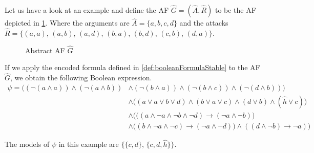 \begin{example}
    Let us have a look at an example and define the AF $\hat{G}=(\hat{A}, \hat{R})$ to be the AF depicted in \cref{af:algorithmEncodingsStable}. Where the arguments are $\hat{A}=\{a, b, c, d\}$ and the attacks $\hat{R}=\big\{ (a,a)$, $(a,b)$, $(a,d)$, $(b,a)$, $(b,d)$, $(c,b)$, $(d,a)\big\}$.

    \begin{figure}[H]
        \centering
        \caption{Abstract AF $\hat{G}$}
        \label{af:algorithmEncodingsStable}
    \end{figure}

If we apply the encoded formula defined in \cref{def:booleanFormulaStable} to the AF $\hat{G}$, we obtain the following Boolean expression.
\begin{align*}
    \psi = \bigl( (\lnot (a \land a)) \land (\lnot (a \land b)) 
    & \land (\lnot (b \land a)) \land (\lnot (b \land c)) \land (\lnot (d \land b)) \bigl) \\
    &\land \bigl( (a \lor a \lor b \lor d) \land (b \lor a \lor c) \land (d \lor b) \land (\hat{h} \lor c)\bigl) \\
    &\land \bigl( ((a \land \lnot a \land \lnot b \land \lnot d) \rightarrow (\lnot a \land \lnot b)\bigl)\\
    &\land \bigl((b \land \lnot a \land \lnot c) \rightarrow (\lnot a \land \lnot d)) \land ((d \land \lnot b) \rightarrow \lnot a)\bigl)
\end{align*}


The models of $\psi$ in this example are $\bigl\{$$\{c, d\}$, $\{c, d, \hat{h}\} \bigl\}$.
\end{example}

